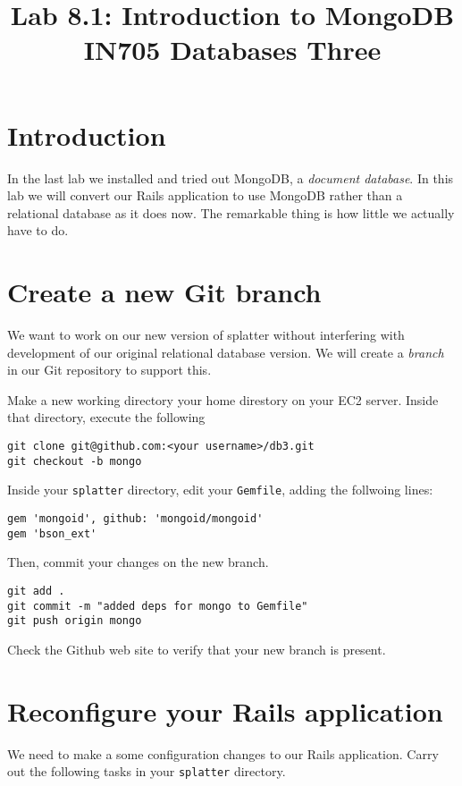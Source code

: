 \documentclass{article}
\begin{document}
\title{Lab 8.1: Introduction to MongoDB\\ IN705 Databases Three}
\date{}
\maketitle

\section*{Introduction}
In the last lab we installed and tried out MongoDB, a \emph{document database}.  In this lab we will convert
our Rails application to use MongoDB rather than a relational database as it does now.  The remarkable thing 
is how little we actually have to do.

\section{Create a new Git branch}
We want to work on our new version of splatter without interfering with development of our original relational database version.  We will create a \emph{branch} in our Git repository to support this.

Make a new working directory your home direstory on your EC2 server.  Inside that directory, execute the
following

\begin{verbatim}
git clone git@github.com:<your username>/db3.git
git checkout -b mongo
\end{verbatim}

Inside your \texttt{splatter} directory, edit your \texttt{Gemfile}, adding the follwoing lines:

\begin{verbatim}
gem 'mongoid', github: 'mongoid/mongoid'
gem 'bson_ext'
\end{verbatim}

Then, commit your changes on the new branch.

\begin{verbatim}
git add .
git commit -m "added deps for mongo to Gemfile"
git push origin mongo
\end{verbatim}

Check the Github web site to verify that your new branch is present.

\section{Reconfigure your Rails application}
We need to make a some configuration changes to our Rails application. Carry out the 
following tasks in your \texttt{splatter} directory.
\end{document}
